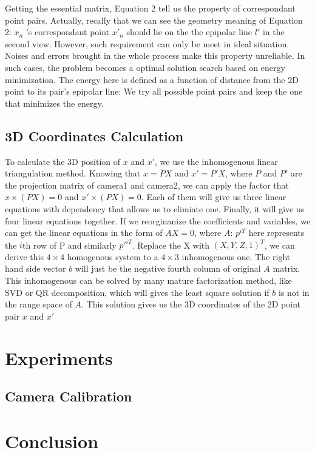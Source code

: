 \documentclass[10pt,twocolumn,letterpaper]{article}
\begin{document}
Getting the essential matrix, Equation 2 tell us the property of correspondant point pairs. Actually, recally that \endequation we can see the geometry meaning of Equation 2: $x_{n}$ 's correspondant point $x'_{n}$ should lie on the the epipolar line $l'$ in the second view. 
However, such requirement can only be meet in ideal situation. Noises and errors brought in the whole process make this property unreliable. In such cases, the problem becomes a optimal solution search based on energy minimization. The energy here is defined as a function of distance from the 2D point to its pair's epipolar line:   \endequation We try all possible point pairs and keep the one that minimizes the energy.

\subsection{3D Coordinates Calculation}
To calculate the 3D position of $x$ and $x'$, we use the inhomogenous linear triangulation method\cite{multipleview}. Knowing that $x = PX$ and $x' = P'X$, where $P$ and $P'$ are the projection matrix of camera1 and camera2, we can apply the factor that $x\times(PX) = 0$ and $x'\times(PX) = 0$. Each of them will give us three linear equations with dependency that allows us to elimiate one. Finally, it will give us four linear equations together. If we reorginanize the coefficients and variables, we can get the linear equations in the form of $AX = 0$, where $A$:
\endequation
$p^{iT}$ here represents the $i$th row of P and similarly $p'^{iT}$. Replace the X with $(X,Y,Z,1)^{T}$, we can derive this $4\times4$ homogenous system to a $4\times3$ inhomogenous one. The right hand side vector $b$ will just be the negative fourth column of original $A$ matrix. This inhomogenous can be solved by many mature factorization method, like SVD or QR decomposition, which will gives the least square solution if $b$ is not in the range space of $A$. This solution gives us the 3D coordinates of the 2D point pair $x$ and $x'$



\section{Experiments}
\subsection{Camera Calibration}
\subsection{}
\section{Conclusion}


{\small


}

\end{document}
